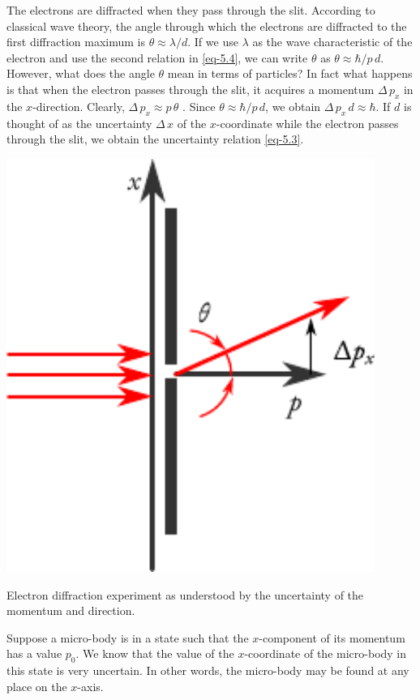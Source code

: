 The electrons are diffracted when they pass through the slit. According to classical wave theory, the angle through which the electrons are diffracted to the first diffraction maximum is $\theta \approx \lambda / d$. If we use $\lambda$ as the wave characteristic of the electron and use the second relation in \eqref{eq-5.4}, we can write $\theta$ as $\theta \approx \hbar /p \, d$. However, what does the angle $\theta$ mean in terms of particles? In fact what happens is that when the electron passes through the slit, it acquires a momentum $\Delta \, p_{x}$ in the $x$-direction. Clearly,  $\Delta \, p_{x} \approx p \, \theta$ . Since $ \theta \approx \hbar /p \, d$, we obtain  $\Delta \, p_{x} \, d \approx \hbar$. If $d$ is thought of as the uncertainty  $\Delta \, {x}$  of the $x$-coordinate while the electron passes through the slit, we obtain the uncertainty relation \eqref{eq-5.3}.



\begin{marginfigure}%
\centering
\includegraphics[width=0.9\textwidth]{figures/diffraction-02.pdf}
\caption{ Electron diffraction experiment as understood by the uncertainty of the momentum and direction.\label{diffraction2}}
\end{marginfigure}


 Suppose a micro-body is in a state such that the $x$-component of its momentum has a value $p_{0}$. We know that the value of the $x$-coordinate of the micro-body in this state is very uncertain. In other words, the micro-body may be found at any place on the $x$-axis.

